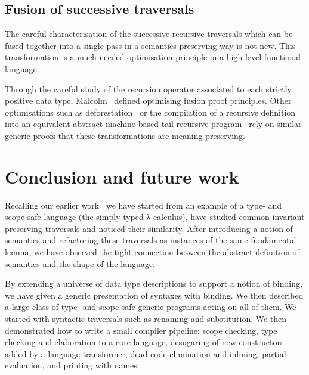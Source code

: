 \subsection{Fusion of successive traversals}

The careful characterisation of the successive recursive traversals which can be
fused together into a single pass in a semantics-preserving way is not new. This
transformation is a much needed optimisation principle in a high-level functional
language.

Through the careful study of the recursion operator associated to each
strictly positive data type,
Malcolm~\citeyear{DBLP:journals/scp/Malcolm90} defined optimising
fusion proof principles.
%
Other optimisations such as deforestation~\cite{DBLP:journals/tcs/Wadler90}
or the compilation of a recursive definition into an equivalent abstract
machine-based tail-recursive program~\cite{DBLP:conf/icfp/CortinasS18}
rely on similar generic proofs that these transformations are meaning-preserving.




\section{Conclusion and future work}

Recalling our earlier work~\citeyear{allais2017type}
we have started from an example of a type- and scope-safe language (the simply typed
λ-calculus), have studied common invariant preserving traversals and noticed their
similarity. After introducing a notion of semantics and refactoring these traversals as
instances of the same fundamental lemma, we have observed the tight
connection between the abstract definition of semantics and the shape of the
language.

By extending a universe of data type descriptions to support a notion of binding,
we have given a generic presentation of syntaxes with binding. We then described
a large class of type- and scope-safe generic programs acting on all of them.
We started with syntactic traversals such as renaming and substitution. We then
demonstrated how to write a small compiler pipeline: scope checking, type checking
and elaboration to a core language, desugaring of new constructors added by a language
transformer, dead code elimination and inlining, partial evaluation, and printing
with names.


